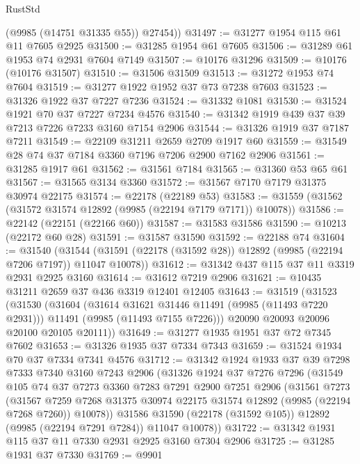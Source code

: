 \begin{lexlean}{RustStd}
\begin{coremodule}
        (@9985 (@14751 @31335 @55))
        @27454))
@31497 := @31277 @1954 @115 @61 @11 @7605 @2925
@31500 := @31285 @1954 @61 @7605
@31506 := @31289 @61 @1953 @74 @2931 @7604 @7149
@31507 := @10176 @31296
@31509 := @10176 (@10176 @31507)
@31510 := @31506 @31509
@31513 := @31272 @1953 @74 @7604
@31519 := @31277 @1922 @1952 @37 @73 @7238 @7603
@31523 := @31326 @1922 @37 @7227 @7236
@31524 := @31332 @1081
@31530 := @31524 @1921 @70 @37 @7227 @7234 @4576
@31540 := @31342 @1919 @439 @37 @39 @7213 @7226 @7233 @3160 @7154 @2906
@31544 := @31326 @1919 @37 @7187 @7211
@31549 := @22109 @31211 @2659 @2709 @1917 @60
@31559 := @31549 @28 @74 @37 @7184 @3360 @7196 @7206 @2900 @7162 @2906
@31561 := @31285 @1917 @61
@31562 := @31561 @7184
@31565 := @31360 @53 @65 @61
@31567 := @31565 @3134 @3360
@31572 := @31567 @7170 @7179 @31375 @30974 @22175
@31574 := @22178 (@22189 @53)
@31583 := @31559 (@31562 (@31572 @31574 @12892 (@9985 (@22194 @7179 @7171)) @10078))
@31586 := @22142 (@22151 (@22166 @60))
@31587 := @31583 @31586
@31590 := @10213 (@22172 @60 @28)
@31591 := @31587 @31590
@31592 := @22188 @74
@31604 := @31540
    (@31544 (@31591 (@22178 (@31592 @28)) @12892 (@9985 (@22194 @7206 @7197)) @11047 @10078))
@31612 := @31342 @437 @115 @37 @11 @3319 @2931 @2925 @3160
@31614 := @31612 @7219 @2906
@31621 := @10435 @31211 @2659 @37 @436 @3319 @12401 @12405
@31643 := @31519
    (@31523
      (@31530
        (@31604
          (@31614 @31621 @31446 @11491 (@9985 (@11493 @7220 @2931)))
          @11491
          (@9985 (@11493 @7155 @7226)))
        @20090
        @20093
        @20096
        @20100
        @20105
        @20111))
@31649 := @31277 @1935 @1951 @37 @72 @7345 @7602
@31653 := @31326 @1935 @37 @7334 @7343
@31659 := @31524 @1934 @70 @37 @7334 @7341 @4576
@31712 := @31342
    @1924
    @1933
    @37
    @39
    @7298
    @7333
    @7340
    @3160
    @7243
    @2906
    (@31326
      @1924
      @37
      @7276
      @7296
      (@31549
        @105
        @74
        @37
        @7273
        @3360
        @7283
        @7291
        @2900
        @7251
        @2906
        (@31561
          @7273
          (@31567
            @7259
            @7268
            @31375
            @30974
            @22175
            @31574
            @12892
            (@9985 (@22194 @7268 @7260))
            @10078))
        @31586
        @31590
        (@22178 (@31592 @105))
        @12892
        (@9985 (@22194 @7291 @7284))
        @11047
        @10078))
@31722 := @31342 @1931 @115 @37 @11 @7330 @2931 @2925 @3160 @7304 @2906
@31725 := @31285 @1931 @37 @7330
@31769 := @9901

\end{coremodule}
\end{lexlean}
